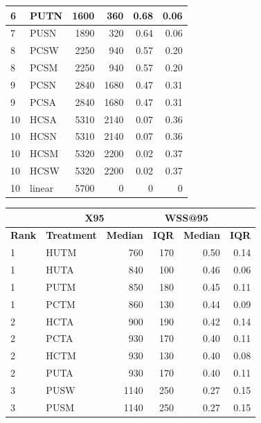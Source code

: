 \documentclass{svjour3}
\theoremstyle{break}
\begin{document}
\begin{table}
\begin{center}
{{\begin{tabular}{l@{~~~}l@{~~~}r@{~~~}r@{~~~}r@{~~~}r}
  6 &         PUTN &    1600   &  360  & 0.68 & 0.06 \\
\hline  7 &         PUSN &    1890   &  320  &  0.64 & 0.06 \\
\hline
  8 &         PCSW &    2250   &  940  & 0.57 & 0.20 \\
  8 &         PCSM &    2250   &  940  & 0.57 & 0.20 \\
\hline  9 &         PCSN &    2840   &  1680  & 0.47 & 0.31 \\
  9 &         PCSA &    2840   &  1680  & 0.47 & 0.31 \\
\hline 10 &         HCSA &    5310   &  2140  & 0.07 & 0.36 \\
 10 &         HCSN &    5310   &  2140  & 0.07 & 0.36  \\
 10 &         HCSM &    5320   &  2200  &  0.02 & 0.37  \\
 10 &         HCSW &    5320   &  2200  & 0.02 & 0.37 \\
 \rowcolor{blue!50}
 10 &       linear &    5700   &  0  & 0 & 0 \\
\hline \end{tabular}}}
\parbox{.49\linewidth}{
\centering
{\scriptsize \begin{tabular}{l@{~~~}l@{~~~}r@{~~~}r@{~~~}r@{~~~}r}
\arrayrulecolor{lightgray}
\multicolumn{2}{l}{\textbf{Kitchenham}}  & \multicolumn{2}{c}{\textbf{X95}} & \multicolumn{2}{c}{\textbf{WSS@95}}\\\hline
\textbf{Rank} & \textbf{Treatment} & \textbf{Median} & \textbf{IQR} & \textbf{Median} & \textbf{IQR} \\\hline
\rowcolor{green!40}
  1 &         HUTM &    760  &  170 & 0.50 & 0.14 \\
  1 &         HUTA &    840  &  100 & 0.46 & 0.06 \\
  1 &         PUTM &    850  &  180 & 0.45 & 0.11 \\
  1 &         PCTM &    860  &  130 & 0.44 & 0.09 \\
\hline  2 &         HCTA &    900  &  190 & 0.42 & 0.14 \\
  2 &         PCTA &    930  &  170 & 0.40 & 0.11 \\
  2 &         HCTM &    930  &  130 & 0.40 & 0.08 \\
  2 &         PUTA &    930  &  170 & 0.40 & 0.11 \\
\hline  3 &         PUSW &    1140  &  250 & 0.27 & 0.15 \\
  3 &         PUSM &    1140  &  250 & 0.27 & 0.15 \\

\end{tabular}}}
\end{center}
\end{table}
\end{document}
